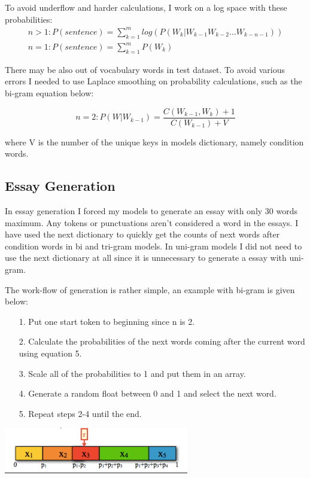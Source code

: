 \documentclass{article}
\begin{document}
To avoid underflow and harder calculations, I work on a log space with these probabilities:
\begin{gather}
n > 1: P(sentence) = \sum_{k=1}^mlog(P(W_k | W_{k-1} W_{k-2} ... W_{k-n-1})) \\
n = 1: P(sentence) = \sum_{k=1}^mP(W_k)
\end{gather}

There may be also out of vocabulary words in test dataset. To avoid various errors I needed to use Laplace smoothing on probability calculations, such as the bi-gram equation below:

\begin{equation}
n = 2:
P(W | W_{k-1}) = \frac{C(W_{k-1}, W_k) + 1}{C(W_{k-1}) + V}
\end{equation}

where V is the number of the unique keys in models dictionary, namely condition words.
\subsection{Essay Generation}

In essay generation I forced my models to generate an essay with only 30 words maximum. Any tokens or punctuations aren't considered a word in the essays. I have used the next dictionary to quickly get the counts of next words after condition words in bi and tri-gram models. In uni-gram models I did not need to use the next dictionary at all since it is unnecessary to generate a essay with uni-gram.

The work-flow of generation is rather simple, an example with bi-gram is given below:
\begin{itemize}
\item[1.] Put one start token to beginning since n is 2.
\item[2.] Calculate the probabilities of the next words coming after the current word using equation 5.
\item[3.] Scale all of the probabilities to 1 and put them in an array.
\item[4.] Generate a random float between 0 and 1 and select the next word.
\item[5.] Repeat steps 2-4 until the end.
\end{itemize}

\begin{center}
\includegraphics[width=0.7\linewidth, height=2cm]{essay}
\end{center}
\end{document}
